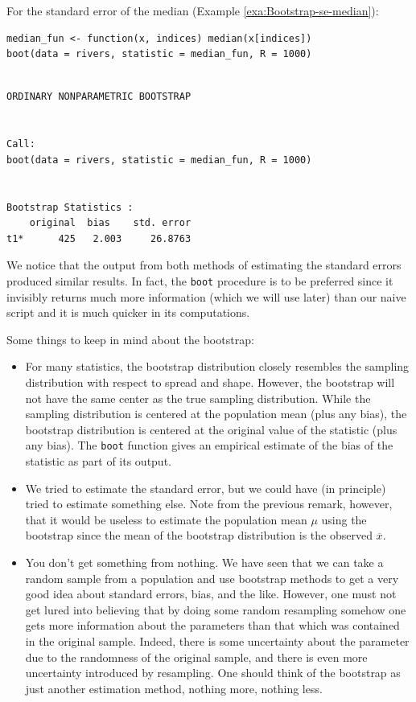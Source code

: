 \documentclass[captions=tableheading]{scrbook}
\begin{document}
For the standard error of the median (Example \ref{exa:Bootstrap-se-median}):


\begin{verbatim}
median_fun <- function(x, indices) median(x[indices])
boot(data = rivers, statistic = median_fun, R = 1000)
\end{verbatim}


\begin{verbatim}

ORDINARY NONPARAMETRIC BOOTSTRAP


Call:
boot(data = rivers, statistic = median_fun, R = 1000)


Bootstrap Statistics :
    original  bias    std. error
t1*      425   2.003     26.8763
\end{verbatim}

We notice that the output from both methods of estimating the standard errors produced similar results. In fact, the \texttt{boot} procedure is to be preferred since it invisibly returns much more information (which we will use later) than our naive script and it is much quicker in its computations.

\begin{rem}
Some things to keep in mind about the bootstrap:

\begin{itemize}
\item For many statistics, the bootstrap distribution closely resembles the sampling distribution with respect to spread and shape. However, the bootstrap will not have the same center as the true sampling distribution. While the sampling distribution is centered at the population mean (plus any bias), the bootstrap distribution is centered at the original value of the statistic (plus any bias). The \texttt{boot} function gives an empirical estimate of the bias of the statistic as part of its output.
\item We tried to estimate the standard error, but we could have (in principle) tried to estimate something else. Note from the previous remark, however, that it would be useless to estimate the population mean \(\mu\) using the bootstrap since the mean of the bootstrap distribution is the observed \(\overline{x}\).
\item You don't get something from nothing. We have seen that we can take a random sample from a population and use bootstrap methods to get a very good idea about standard errors, bias, and the like. However, one must not get lured into believing that by doing some random resampling somehow one gets more information about the parameters than that which was contained in the original sample. Indeed, there is some uncertainty about the parameter due to the randomness of the original sample, and there is even more uncertainty introduced by resampling. One should think of the bootstrap as just another estimation method, nothing more, nothing less.
\end{itemize}

\end{rem}
\end{document}

